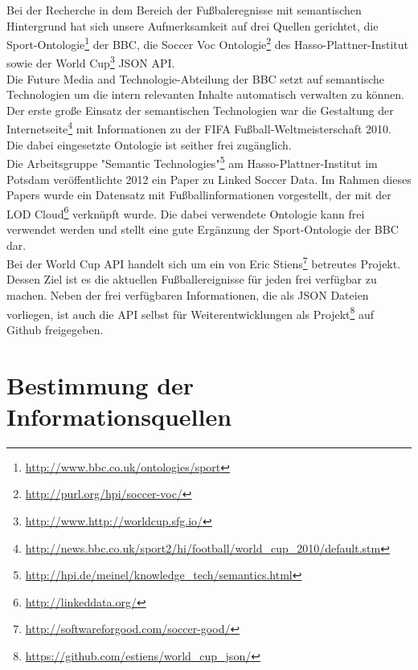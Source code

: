 \documentclass[runningheads,a4paper]{llncs}
\begin{document}
Bei der Recherche in dem Bereich der Fußbaleregnisse mit semantischen Hintergrund hat sich unsere Aufmerksamkeit auf drei Quellen gerichtet, die Sport-Ontologie\footnote{\url{http://www.bbc.co.uk/ontologies/sport}} der BBC, die Soccer Voc Ontologie\footnote{\url{http://purl.org/hpi/soccer-voc/}} des Hasso-Plattner-Institut sowie der World Cup\footnote{\url{http://www.http://worldcup.sfg.io/}} JSON API.\\ Die Future Media and Technologie-Abteilung der BBC setzt auf semantische Technologien um die intern relevanten Inhalte automatisch verwalten zu können. Der erste große Einsatz der semantischen Technologien war die Gestaltung der Internetseite\footnote{\url{http://news.bbc.co.uk/sport2/hi/football/world_cup_2010/default.stm}} mit Informationen zu der FIFA Fußball-Weltmeisterschaft 2010. Die dabei eingesetzte Ontologie ist seither frei zugänglich. \\
Die Arbeitsgruppe "Semantic Technologies"\footnote{\url{http://hpi.de/meinel/knowledge_tech/semantics.html}} am Hasso-Plattner-Institut im Potsdam veröffentlichte 2012 ein Paper zu Linked Soccer Data\cite{url_lsd}. Im Rahmen dieses Papers wurde ein Datensatz mit Fußballinformationen vorgestellt, der mit der LOD Cloud\footnote{\url{http://linkeddata.org/}} verknüpft wurde. Die dabei verwendete Ontologie kann frei verwendet werden und stellt eine gute Ergänzung der Sport-Ontologie der BBC dar.\\
Bei der World Cup API handelt sich um ein von Eric Stiens\footnote{\url{http://softwareforgood.com/soccer-good/}} betreutes Projekt. Dessen Ziel ist es die aktuellen Fußballereignisse für jeden frei verfügbar zu machen. Neben der frei verfügbaren Informationen, die als JSON Dateien vorliegen, ist auch die API selbst für Weiterentwicklungen als Projekt\footnote{\url{https://github.com/estiens/world_cup_json/}} auf Github freigegeben. 


\section{Bestimmung der Informationsquellen}\label{infoQuell}
\end{document}
